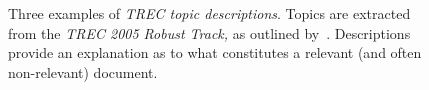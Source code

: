 \begin{figure}[t!]
    \centering
    \caption[Examples of TREC Topics]{Three examples of \emph{TREC topic descriptions}. Topics are extracted from the \emph{TREC 2005 Robust Track,} as outlined by~\cite{voorhees2006trec_robust}. Descriptions provide an explanation as to what constitutes a relevant (and often non-relevant) document.}
    \label{fig:topics}
\end{figure}

